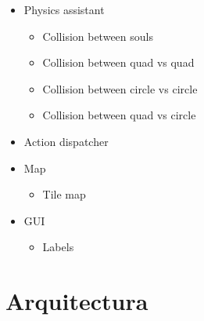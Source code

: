 \documentclass[a4paper]{article}
\begin{document}
\begin{itemize}
  \item Physics assistant
  \begin{itemize}
    \item Collision between souls
    \item Collision between quad vs quad
    \item Collision between circle vs circle
    \item Collision between quad vs circle
  \end{itemize}
  \item Action dispatcher
  \item Map
  \begin{itemize}
    \item Tile map
  \end{itemize}
  \item GUI
  \begin{itemize}
    \item Labels
  \end{itemize}
\end{itemize}

\section{Arquitectura}
\end{document}
